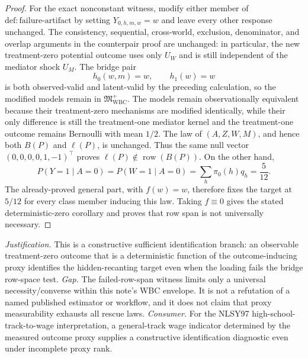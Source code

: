 \documentclass{article}
\begin{document}
\begin{proof}
For the exact nonconstant witness, modify either member of
\(\mathrm{def{:}failure\text{-}artifact}\) by setting
\(Y_{0,h,m,w}=w\) and leave every other response unchanged.  The consistency,
sequential, cross-world, exclusion, denominator, and overlap arguments in the
counterpair proof are unchanged: in particular, the new treatment-zero
potential outcome uses only \(U_W\) and is still independent of the mediator
shock \(U_M\).  The bridge pair
\[
 h_0(w,m)=w,\qquad h_1(w)=w
\]
is both observed-valid and latent-valid by the preceding calculation, so the
modified models remain in \(\mathfrak M_{\mathrm{WBC}}^{+}\).  The models
remain observationally equivalent because their treatment-zero mechanisms
are modified identically, while their only difference is still the
treatment-one mediator kernel and the treatment-one outcome remains
Bernoulli with mean \(1/2\).  The law of \((A,Z,W,M)\), and hence both
\(B(P)\) and \(\ell(P)\), is unchanged.  Thus the same null vector
\((0,0,0,0,1,-1)^{\top}\) proves
\(\ell(P)\notin\operatorname{row}(B(P))\).  On the other hand,
\[
 P(Y=1\mid A=0)=P(W=1\mid A=0)
 =\sum_h\pi _0(h)q_h=\frac5{12}.
\]
The already-proved general part, with \(f(w)=w\), therefore fixes the target
at \(5/12\) for every class member inducing this law.  Taking \(f\equiv0\)
gives the stated deterministic-zero corollary and proves that row span is not
universally necessary.
\end{proof}
\par\smallskip\noindent \textit{Justification.} This is a constructive sufficient identification branch: an observable treatment-zero outcome that is a deterministic function of the outcome-inducing proxy identifies the hidden-recanting target even when the loading fails the bridge row-space test. \textit{Gap.} The failed-row-span witness limits only a universal necessity/converse within this note's WBC envelope. It is not a refutation of a named published estimator or workflow, and it does not claim that proxy measurability exhausts all rescue laws. \textit{Consumer.} For the NLSY97 high-school-track-to-wage interpretation, a general-track wage indicator determined by the measured outcome proxy supplies a constructive identification diagnostic even under incomplete proxy rank.
\end{document}
